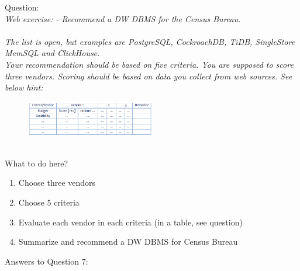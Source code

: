 Question:\\
\emph{
    Web exercise:
- Recommend a DW DBMS for the Census Bureau.\\\\ The list is open, but examples
are PostgreSQL, CockroachDB, TiDB, SingleStore MemSQL and ClickHouse.\\ Your
recommendation should be based on five criteria. You are supposed to score
three vendors. Scoring should be based on data you collect from web sources.
See below hint:
}

\begin{figure}[h] %
    \centering
    \includegraphics[width=0.5\textwidth]{Figures/Q7_QUESTION_table.PNG}
    \label{fig:my_image}
\end{figure}\\

What to do here?
\begin{enumerate}
    \item Choose three vendors
    \item Choose 5 criteria
    \item Evaluate each vendor in each criteria (in a table, see question)
    \item Summarize and recommend a DW DBMS for Census Bureau
  \end{enumerate}
Answers to Question 7:

